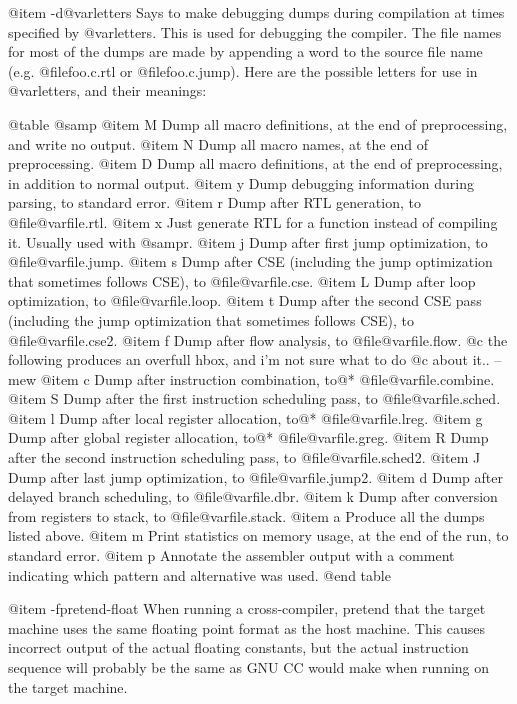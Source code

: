 {@item -d@var{letters}
Says to make debugging dumps during compilation at times specified by
@var{letters}.  This is used for debugging the compiler.  The file names
for most of the dumps are made by appending a word to the source file
name (e.g.  @file{foo.c.rtl} or @file{foo.c.jump}).  Here are the
possible letters for use in @var{letters}, and their meanings:

@table @samp
@item M
Dump all macro definitions, at the end of preprocessing, and write no
output.
@item N
Dump all macro names, at the end of preprocessing.
@item D
Dump all macro definitions, at the end of preprocessing, in addition to
normal output.
@item y
Dump debugging information during parsing, to standard error.
@item r
Dump after RTL generation, to @file{@var{file}.rtl}.
@item x
Just generate RTL for a function instead of compiling it.  Usually used
with @samp{r}.
@item j
Dump after first jump optimization, to @file{@var{file}.jump}.
@item s
Dump after CSE (including the jump optimization that sometimes
follows CSE), to @file{@var{file}.cse}.
@item L
Dump after loop optimization, to @file{@var{file}.loop}.
@item t
Dump after the second CSE pass (including the jump optimization that
sometimes follows CSE), to @file{@var{file}.cse2}.
@item f
Dump after flow analysis, to @file{@var{file}.flow}.
@c the following produces an overfull hbox, and i'm not sure what to do
@c about it.. --mew
@item c
Dump after instruction combination, to@*
@file{@var{file}.combine}.
@item S
Dump after the first instruction scheduling pass, to
@file{@var{file}.sched}.
@item l
Dump after local register allocation, to@*
@file{@var{file}.lreg}.
@item g
Dump after global register allocation, to@*
@file{@var{file}.greg}.
@item R
Dump after the second instruction scheduling pass, to
@file{@var{file}.sched2}.
@item J
Dump after last jump optimization, to @file{@var{file}.jump2}.
@item d
Dump after delayed branch scheduling, to @file{@var{file}.dbr}.
@item k
Dump after conversion from registers to stack, to @file{@var{file}.stack}.
@item a
Produce all the dumps listed above.
@item m
Print statistics on memory usage, at the end of the run, to
standard error.
@item p
Annotate the assembler output with a comment indicating which
pattern and alternative was used.
@end table

@item -fpretend-float
When running a cross-compiler, pretend that the target machine uses the
same floating point format as the host machine.  This causes incorrect
output of the actual floating constants, but the actual instruction
sequence will probably be the same as GNU CC would make when running on
the target machine.

}
